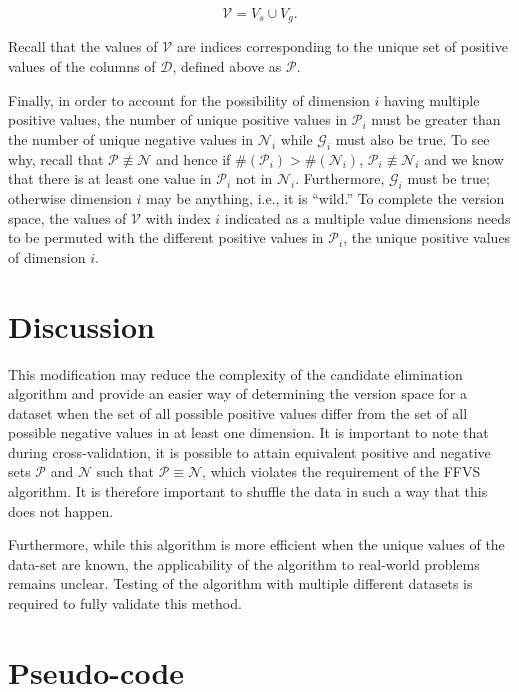 $$\mathcal{V} = V_s \cup V_g.$$

Recall that the values of $\mathcal{V}$ are indices corresponding to the unique set of positive values of the columns of $\mathcal{D}$, defined above as $\mathcal{P}$.

Finally, in order to account for the possibility of dimension $i$ having multiple positive values, the number of unique positive values in $\mathcal{P}_i$ must be greater than the number of unique negative values in $\mathcal{N}_i$ while $\mathcal{G}_i$ must also be true.  To see why, recall that $\mathcal{P} \not\equiv \mathcal{N}$ and hence if $\#(\mathcal{P}_i) > \#(\mathcal{N}_i)$, $\mathcal{P}_i \not\equiv \mathcal{N}_i$ and we know that there is at least one value in $\mathcal{P}_i$ not in $\mathcal{N}_i$.  Furthermore, $\mathcal{G}_i$ must be true; otherwise dimension $i$ may be anything, i.e., it is ``wild.''  To complete the version space, the values of $\mathcal{V}$ with index $i$ indicated as a multiple value dimensions needs to be permuted with the different positive values in $\mathcal{P}_i$, the unique positive values of dimension $i$.

\section{Discussion}

This modification may reduce the complexity of the candidate elimination algorithm and provide an easier way of determining the version space for a dataset when the set of all possible positive values differ from the set of all possible negative values in at least one dimension.  It is important to note that during cross-validation, it is possible to attain equivalent positive and negative sets $\mathcal{P}$ and $\mathcal{N}$ such that $\mathcal{P} \equiv \mathcal{N}$, which violates the requirement of the FFVS algorithm.  It is therefore important to shuffle the data in such a way that this does not happen.

Furthermore, while this algorithm is more efficient when the unique values of the data-set are known, the applicability of the algorithm to real-world problems remains unclear.  Testing of the algorithm with multiple different datasets is required to fully validate this method.

\newpage

\section{Pseudo-code}

